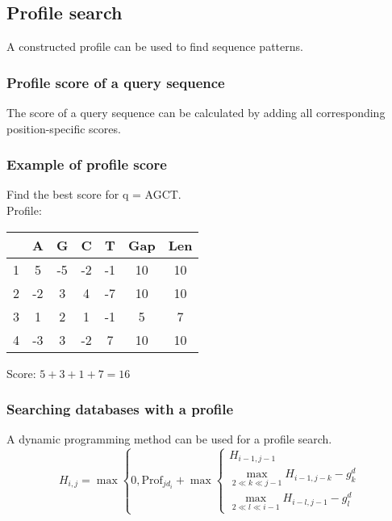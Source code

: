 %
%

%
%
\subsection{Profile search}
A constructed profile can be used to find sequence patterns.

%
%
\subsubsection*{Profile score of a query sequence}
The score of a query sequence can be calculated by adding all corresponding position-specific scores.

%
%
\subsubsection*{Example of profile score}
Find the best score for q = AGCT. \\

\noindent
Profile:
\begin{table}[H]
\centering
\begin{tabular}{|c|c|c|c|c|c|c|}
\hline
  & A  & G  & C  & T  & Gap & Len \\ \hline
1 & 5  & -5 & -2 & -1 & 10  & 10  \\ \hline
2 & -2 & 3  & 4  & -7 & 10  & 10  \\ \hline
3 & 1  & 2  & 1  & -1 & 5   & 7   \\ \hline
4 & -3 & 3  & -2 & 7  & 10  & 10  \\ \hline
\end{tabular}
\end{table}

\noindent
Score: $5 + 3 + 1 + 7 = 16$

%
%
\subsubsection*{Searching databases with a profile}
A dynamic programming method can be used for a profile search. \\

\[
H_{i,j} = \max \left\{0, \mathrm{Prof}_{jd_i} + \max \left\{ \begin{array}{l}
         H_{i-1,j-1} \\
         \max_{2 \ll k \ll j-1} H_{i-1,j-k} - g_k^d  \\
         \max_{2 \ll l \ll i-1} H_{i-l,j-1} - g_l^d  \end{array} \right.  \right. 
\]

